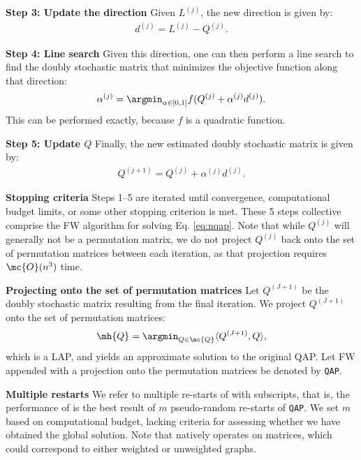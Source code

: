 \documentclass[10pt,journal,cspaper,compsoc]{IEEEtran}
\begin{document}
\textbf{Step 3: Update the direction} Given $L^{(j)}$, the new direction is given by:
\begin{align}
	d^{(j)}=L^{(j)}-Q^{(j)}.
\end{align}


\textbf{Step 4: Line search} Given this direction, one can then perform a line search to find the doubly stochastic matrix that minimizes the objective function along that direction:
\begin{align}\label{eq:step}
	\alpha^{(j)} = \argmin_{\alpha \in [0,1]} f(Q^{(j)} + \alpha^{(j)} d^{(j)}).
\end{align}
This can be performed exactly, because $f$ is a quadratic function.  


\textbf{Step 5: Update $Q$} Finally, the new estimated doubly stochastic matrix is given by:
\begin{align}\label{eq:update}
	Q^{(j+1)} = Q^{(j)} + \alpha^{(j)} d^{(j)}.
\end{align}


\textbf{Stopping criteria} Steps 1--5 are iterated until convergence, computational budget limits, or some other stopping criterion is met.  These 5 steps collective comprise the FW algorithm for solving Eq. \eqref{eq:nqap}.  Note that while $Q^{(j)}$ will generally not be a permutation matrix, we do not project $Q^{(j)}$ back onto the set of permutation matrices between each iteration, as that projection requires $\mc{O}(n^3)$ time.


\textbf{Projecting onto the set of permutation matrices}   Let $Q^{(J+1)}$ be the doubly stochastic matrix resulting from the final iteration.  We project $Q^{(J+1)}$ onto the set of permutation matrices:
\begin{align} \label{eq:proj}
	\mh{Q} = \argmin_{Q \in \mc{Q}} \langle Q^{(J+1)}, Q \rangle,
\end{align}
which is a LAP, and yields an approximate solution to the original QAP.  Let FW appended with a projection onto the permutation matrices be denoted by \texttt{QAP}.


\textbf{Multiple restarts} We refer to multiple re-starts of \qap with subscripts, that is, the performance of \qapm is the best result of $m$ pseudo-random re-starts of \texttt{QAP}.  We set $m$ based on computational budget, lacking criteria for assessing whether we have obtained the global solution. Note that \qap natively operates on matrices, which could correspond to either weighted or unweighted graphs.  
\end{document}
